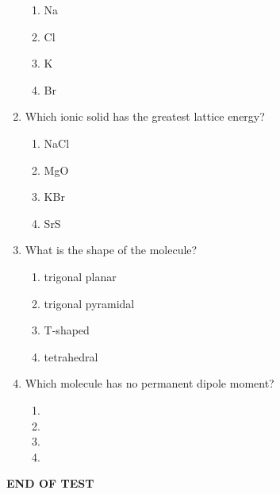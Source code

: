 \documentclass[11pt, leqno]{article}
\begin{document}
\begin{enumerate}[leftmargin = *]
\begin{enumerate}
    \item Na
    \item Cl
    \item K
    \item Br
\end{enumerate}
\item Which ionic solid has the greatest lattice energy?
\begin{enumerate}
    \item NaCl
    \item MgO
    \item KBr
    \item SrS
\end{enumerate}
\item What is the shape of the  molecule?
\begin{enumerate}
    \item trigonal planar
    \item trigonal pyramidal
    \item T-shaped
    \item tetrahedral
\end{enumerate}
\item Which molecule has no permanent dipole moment?
\begin{enumerate}
    \item {}
    \item {}
    \item {}
    \item {}
\end{enumerate}
\end{enumerate}
\begin{center}
    \LARGE\textbf{END OF TEST}
\end{center}
\end{document}
